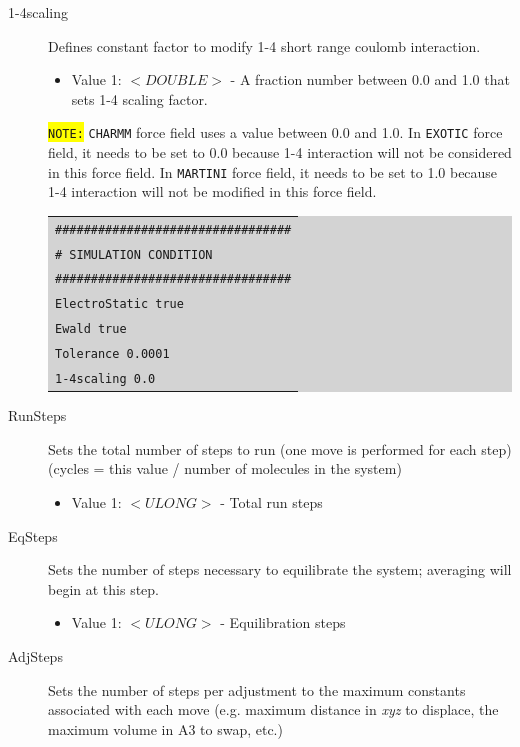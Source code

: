 \begin{description}
\begin{itemize}
	\end{itemize}
\item [1-4scaling] Defines constant factor to modify 1-4 short range coulomb interaction.
	\begin{itemize}
	\item Value 1: $<DOUBLE>$ - A fraction number between 0.0 and 1.0 that sets 1-4 scaling factor.
	\end{itemize}
	\colorbox{yellow}{\texttt{NOTE:}} \texttt{CHARMM} force field uses a value between 0.0 and 1.0. In \texttt{EXOTIC} force field, it needs to be set to 0.0 because 1-4 interaction will not be considered in this force field. In \texttt{MARTINI} force field, it needs to be set to 1.0 because 1-4 interaction will not be modified in this force field.\\
	\colorbox{lightgray}{
	\begin{tabular}{l}
	\texttt{\#\#\#\#\#\#\#\#\#\#\#\#\#\#\#\#\#\#\#\#\#\#\#\#\#\#\#\#\#\#\#\#\#}\\
	\texttt{\# SIMULATION CONDITION}\\
	\texttt{\#\#\#\#\#\#\#\#\#\#\#\#\#\#\#\#\#\#\#\#\#\#\#\#\#\#\#\#\#\#\#\#\#}\\
	\texttt{ElectroStatic 		true}\\
	\texttt{Ewald		   		true}\\
	\texttt{Tolerance	        	0.0001}\\
	\texttt{1-4scaling			0.0}\\
	\end{tabular}}
\item [RunSteps] Sets the total number of steps to run (one move is performed for each step) (cycles = this value / number of molecules in the system)
	\begin{itemize}
	\item Value 1: $<ULONG>$ - Total run steps
	\end{itemize}
\item [EqSteps] Sets the number of steps necessary to equilibrate the system; averaging will begin at this step.
	\begin{itemize}
	\item Value 1: $<ULONG>$ - Equilibration steps
	\end{itemize}
\item [AdjSteps] Sets the number of steps per adjustment to the maximum constants associated with each move (e.g. maximum distance in \textit{xyz} to displace, the maximum volume in A3 to swap, etc.)
	\begin{itemize}

\end{itemize}
\end{description}
